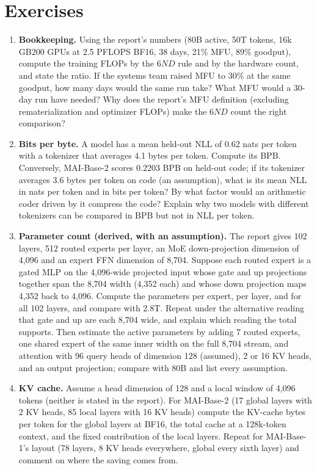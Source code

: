 \documentclass[11pt,letterpaper]{article}
\begin{document}
\clearpage
\section{Exercises}

\begin{enumerate}[leftmargin=1.6em,itemsep=6pt]
\item \textbf{Bookkeeping.} Using the report's numbers (80B active, 50T tokens, 16k GB200 GPUs at 2.5 PFLOPS BF16, 38 days, 21\% MFU, 89\% goodput), compute the training FLOPs by the $6ND$ rule and by the hardware count, and state the ratio. If the systems team raised MFU to 30\% at the same goodput, how many days would the same run take? What MFU would a 30-day run have needed? Why does the report's MFU definition (excluding rematerialization and optimizer FLOPs) make the $6ND$ count the right comparison?
\item \textbf{Bits per byte.} A model has a mean held-out NLL of 0.62 nats per token with a tokenizer that averages 4.1 bytes per token. Compute its BPB. Conversely, MAI-Base-2 scores 0.2203 BPB on held-out code; if its tokenizer averages 3.6 bytes per token on code (an assumption), what is its mean NLL in nats per token and in bits per token? By what factor would an arithmetic coder driven by it compress the code? Explain why two models with different tokenizers can be compared in BPB but not in NLL per token.
\item \textbf{Parameter count (derived, with an assumption).} The report gives 102 layers, 512 routed experts per layer, an MoE down-projection dimension of 4,096 and an expert FFN dimension of 8,704. Suppose each routed expert is a gated MLP on the 4,096-wide projected input whose gate and up projections together span the 8,704 width (4,352 each) and whose down projection maps 4,352 back to 4,096. Compute the parameters per expert, per layer, and for all 102 layers, and compare with 2.8T. Repeat under the alternative reading that gate and up are each 8,704 wide, and explain which reading the total supports. Then estimate the active parameters by adding 7 routed experts, one shared expert of the same inner width on the full 8,704 stream, and attention with 96 query heads of dimension 128 (assumed), 2 or 16 KV heads, and an output projection; compare with 80B and list every assumption.
\item \textbf{KV cache.} Assume a head dimension of 128 and a local window of 4,096 tokens (neither is stated in the report). For MAI-Base-2 (17 global layers with 2 KV heads, 85 local layers with 16 KV heads) compute the KV-cache bytes per token for the global layers at BF16, the total cache at a 128k-token context, and the fixed contribution of the local layers. Repeat for MAI-Base-1's layout (78 layers, 8 KV heads everywhere, global every sixth layer) and comment on where the saving comes from.

\end{enumerate}
\end{document}
